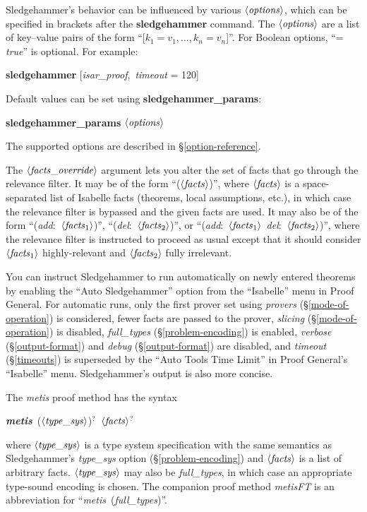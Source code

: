 \documentclass[a4paper,12pt]{article}
\def\qty#1{\ensuremath{\left<\mathit{#1\/}\right>}}
\begin{document}
Sledgehammer's behavior can be influenced by various \qty{options}, which can be
specified in brackets after the \textbf{sledgehammer} command. The
\qty{options} are a list of key--value pairs of the form ``[$k_1 = v_1,
\ldots, k_n = v_n$]''. For Boolean options, ``= \textit{true}'' is optional. For
example:

\prew
\textbf{sledgehammer} [\textit{isar\_proof}, \,\textit{timeout} = 120]
\postw

Default values can be set using \textbf{sledgehammer\_\allowbreak params}:

\prew
\textbf{sledgehammer\_params} \qty{options}
\postw

The supported options are described in \S\ref{option-reference}.

The \qty{facts\_override} argument lets you alter the set of facts that go
through the relevance filter. It may be of the form ``(\qty{facts})'', where
\qty{facts} is a space-separated list of Isabelle facts (theorems, local
assumptions, etc.), in which case the relevance filter is bypassed and the given
facts are used. It may also be of the form ``(\textit{add}:\ \qty{facts\/_{\mathrm{1}}})'',
``(\textit{del}:\ \qty{facts\/_{\mathrm{2}}})'', or ``(\textit{add}:\ \qty{facts\/_{\mathrm{1}}}\
\textit{del}:\ \qty{facts\/_{\mathrm{2}}})'', where the relevance filter is instructed to
proceed as usual except that it should consider \qty{facts\/_{\mathrm{1}}}
highly-relevant and \qty{facts\/_{\mathrm{2}}} fully irrelevant.

You can instruct Sledgehammer to run automatically on newly entered theorems by
enabling the ``Auto Sledgehammer'' option from the ``Isabelle'' menu in Proof
General. For automatic runs, only the first prover set using \textit{provers}
(\S\ref{mode-of-operation}) is considered, fewer facts are passed to the prover,
\textit{slicing} (\S\ref{mode-of-operation}) is disabled, \textit{full\_types}
(\S\ref{problem-encoding}) is enabled, \textit{verbose} (\S\ref{output-format})
and \textit{debug} (\S\ref{output-format}) are disabled, and \textit{timeout}
(\S\ref{timeouts}) is superseded by the ``Auto Tools Time Limit'' in Proof
General's ``Isabelle'' menu. Sledgehammer's output is also more concise.

The \textit{metis} proof method has the syntax

\prew
\textbf{\textit{metis}}~(\qty{type\_sys})${}^?$~\qty{facts}${}^?$
\postw

where \qty{type\_sys} is a type system specification with the same semantics as
Sledgehammer's \textit{type\_sys} option (\S\ref{problem-encoding}) and
\qty{facts} is a list of arbitrary facts. \qty{type\_sys} may also be
\textit{full\_types}, in which case an appropriate type-sound encoding is
chosen. The companion proof method \textit{metisFT} is an abbreviation for
``\textit{metis}~(\textit{full\_types})''.
\end{document}
